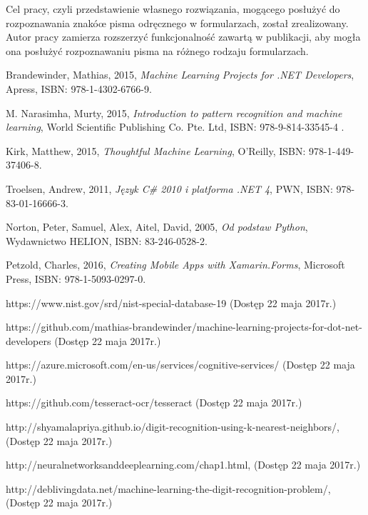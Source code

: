 \documentclass[brudnopis]{xmgr}
\begin{document}
Cel pracy, czyli przedstawienie własnego rozwiązania, mogącego posłużyć do rozpoznawania znakóœ pisma odręcznego w formularzach, został zrealizowany. Autor pracy zamierza rozszerzyć funkcjonalność zawartą w publikacji, aby mogła ona posłużyć rozpoznawaniu pisma na różnego rodzaju formularzach.




\begin{thebibliography}{9}

  Brandewinder,
  Mathias,
  2015,
  \emph{Machine Learning Projects for .NET Developers},
  Apress,
  ISBN: 978-1-4302-6766-9.

  M. Narasimha,
  Murty,
  2015,
  \emph{Introduction to pattern recognition and machine learning},
  World Scientific Publishing Co. Pte. Ltd,
  ISBN: 978-9-814-33545-4 .  

  Kirk,
  Matthew,
  2015,
  \emph{Thoughtful Machine Learning},
  O'Reilly,
  ISBN: 978-1-449-37406-8.
  
  Troelsen,
  Andrew,
  2011,
  \emph{Język C\# 2010 i platforma .NET 4},
  PWN,
  ISBN: 978-83-01-16666-3.
  
  Norton,
  Peter,
  Samuel,
  Alex,
  Aitel,
  David,
  2005,
  \emph{Od podstaw Python},
  Wydawnictwo HELION,
  ISBN: 83-246-0528-2.  
  
  Petzold,
  Charles,
  2016,
  \emph{Creating Mobile Apps with Xamarin.Forms},
  Microsoft Press,
  ISBN: 978-1-5093-0297-0.  

  https://www.nist.gov/srd/nist-special-database-19
  (Dostęp 22 maja 2017r.)

  https://github.com/mathias-brandewinder/machine-learning-projects-for-dot-net-developers
  (Dostęp 22 maja 2017r.)
  
  https://azure.microsoft.com/en-us/services/cognitive-services/
  (Dostęp 22 maja 2017r.)

  https://github.com/tesseract-ocr/tesseract
  (Dostęp 22 maja 2017r.)
  
  http://shyamalapriya.github.io/digit-recognition-using-k-nearest-neighbors/,
  (Dostęp 22 maja 2017r.)

  http://neuralnetworksanddeeplearning.com/chap1.html,
  (Dostęp 22 maja 2017r.)

  http://deblivingdata.net/machine-learning-the-digit-recognition-problem/,
  (Dostęp 22 maja 2017r.)


\end{thebibliography}
\end{document}

